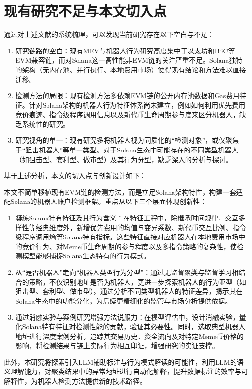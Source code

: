 \section{现有研究不足与本文切入点}

\par 通过对上述文献的系统梳理，可以发现当前研究存在以下空白与不足：
\begin{enumerate}
    \item 研究链路的空白：现有MEV与机器人行为研究高度集中于以太坊和BSC等EVM兼容链，而对Solana这一高性能非EVM链的关注严重不足。Solana独特的架构（无内存池、并行执行、本地费用市场）使得现有结论和方法难以直接迁移。
    \item 检测方法的局限：现有检测方法多依赖EVM链的公开内存池数据和Gas费用特征。针对Solana架构的机器人行为特征体系尚未建立，例如如何利用优先费用竞价痕迹、指令级程序调用信息以及新代币生命周期参与度来区分机器人，缺乏系统性的研究。
    \item 研究视角的单一：现有研究多将机器人视为同质化的“检测对象”，或仅聚焦于“狙击机器人”等单一类型。对于Solana生态中可能存在的不同类型机器人（如狙击型、套利型、做市型）及其行为分型，缺乏深入的分析与探讨。
\end{enumerate}
\par 基于上述分析，本文的切入点与创新设计如下：
\par 本文不简单移植现有EVM链的检测方法，而是立足Solana架构特性，构建一套适配Solana的机器人账户检测框架。重点从以下三个层面体现创新性：
\begin{enumerate}
    \item 凝练Solana特有特征及其行为含义：在特征工程中，除继承时间规律、交互多样性等经典维度外，新增优先费用的均值与变异系数、新代币交互比例、指令级程序调用熵等Solana特有指标。这些特征直接对应机器人在本地费用市场中的竞价行为、对Meme币生命周期的参与程度以及多指令策略的复杂性，使检测模型能够捕捉Solana生态特有的行为模式。
    \item 从“是否机器人”走向“机器人类型行为分型”：通过无监督聚类与监督学习相结合的策略，不仅识别地址是否为机器人，更进一步探索机器人的行为亚型（如狙击型、套利型、做市型）。通过分析不同类型机器人的特征差异，揭示其在Solana生态中的功能分化，为后续更精细化的监管与市场分析提供依据。
    \item 通过消融实验与案例研究增强方法说服力：在模型评估中，设计消融实验，量化Solana特有特征对检测性能的贡献，验证其必要性。同时，选取典型机器人地址进行深度案例分析，追踪其交易历史、资金流向及对特定Meme币价格的影响，将检测结果与链上实际行为相互印证，增强研究的实证支撑。
\end{enumerate}
\par 此外，本研究将探索引入LLM辅助标注与行为模式解读的可能性，利用LLM的语义理解能力，对聚类结果中的异常地址进行自动化解释，提升数据标注的效率与可解释性，为机器人检测方法提供新的技术路径。


\newpage
\begingroup
    \printbibliography[title={参考文献}]
\endgroup
